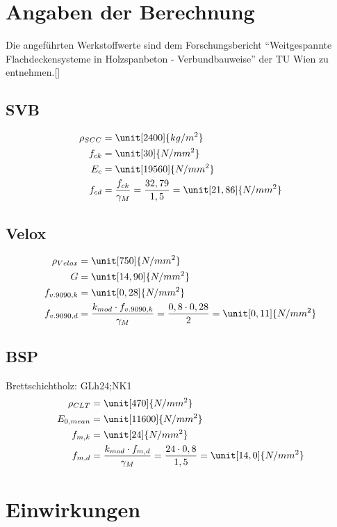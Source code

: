 \section{Angaben der Berechnung}

Die angeführten Werkstoffwerte sind dem Forschungsbericht "`Weitgespannte Flachdeckensysteme in Holzspanbeton - Verbundbauweise"' der TU Wien zu entnehmen.[]

\subsection{SVB}

\begin{align*}
\rho_{SCC}&=\unit[2400]{kg/m^{2}}\\
 f_{ck}&= \unit[30]{N/mm^{2}}\\
 E_{c}&= \unit[19560]{N/mm^{2}}\\
 f_{cd}&=\dfrac{f_{ck}}{\gamma_{M}}=\dfrac{32,79}{1,5}=\unit[21,86]{N/mm^{2}}
\end{align*}

\subsection{Velox}
\begin{align*}
\rho_{Velox}&=\unit[750]{N/mm^{2}}\\
G&=\unit[14,90]{N/mm^{2}}\\
f_{v.9090,k}&= \unit[0,28]{N/mm^{2}}\\
f_{v.9090,d}&=\dfrac{k_{mod} \cdot f_{v.9090,k}}{\gamma_{M}}=\dfrac{0,8 \cdot 0,28}{2}=\unit[0,11]{N/mm^{2}}\\ 
\end{align*}
\subsection{BSP}

Brettschichtholz: GLh24;NK1 \\
\begin{align*}
\rho_{CLT}&=\unit[470]{N/mm^{2}}\\
E_{0,mean}&=\unit[11600]{N/mm^{2}} \\
f_{m,k}&=\unit[24]{N/mm^{2}} \\
 f_{m,d}&=\dfrac{k_{mod} \cdot f_{m,d}}{\gamma_{M}}=\dfrac{24 \cdot 0,8}{1,5}=\unit[14,0]{N/mm^{2}}
\end{align*}


\section{Einwirkungen}


